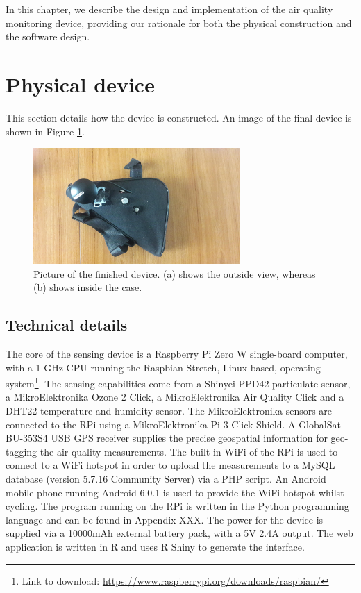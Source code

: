 \documentclass[11pt]{report}
\begin{document}
In this chapter, we describe the design and implementation of the air quality monitoring device, providing our rationale for both the physical construction and the software design.

\section{Physical device}

This section details how the device is constructed. An image of the final device is shown in Figure \ref{device}.

\begin{figure}[!htb]
\centering
\includegraphics[width=0.7\textwidth]{device}
\caption[Finished device.]{Picture of the finished device. (a) shows the outside view, whereas (b) shows inside the case.}
\label{device}
\end{figure}



\subsection{Technical details}

The core of the sensing device is a Raspberry Pi Zero W single-board computer, with a 1 GHz CPU running the Raspbian Stretch, Linux-based, operating system\footnote{Link to download: \href{https://www.raspberrypi.org/downloads/raspbian/}{https://www.raspberrypi.org/downloads/raspbian/}}. The sensing capabilities come from a Shinyei PPD42 particulate sensor, a MikroElektronika Ozone 2 Click, a MikroElektronika Air Quality Click and a DHT22 temperature and humidity sensor. The MikroElektronika sensors are connected to the RPi using a MikroElektronika Pi 3 Click Shield. A GlobalSat BU-353S4 USB GPS receiver supplies the precise geospatial information for geo-tagging the air quality measurements. The built-in WiFi of the RPi is used to connect to a WiFi hotspot in order to upload the measurements to a MySQL database (version 5.7.16 Community Server) via a PHP script. An Android mobile phone running Android 6.0.1 is used to provide the WiFi hotspot whilst cycling. The program running on the RPi is written in the Python programming language and can be found in Appendix XXX. The power for the device is supplied via a 10000mAh external battery pack, with a 5V 2.4A output. The web application is written in R and uses R Shiny to generate the interface.
\end{document}
